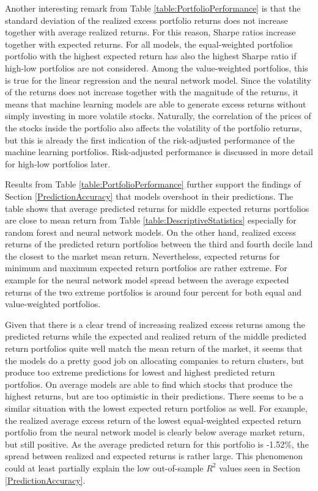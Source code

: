 \documentclass[12pt]{article}
\begin{document}
Another interesting remark from Table \ref{table:PortfolioPerformance} is that the standard deviation of the realized excess portfolio returns does not increase together with average realized returns. For this reason, Sharpe ratios increase together with expected returns. For all models, the equal-weighted portfolios portfolio with the highest expected return has also the highest Sharpe ratio if high-low portfolios are not considered. Among the value-weighted portfolios, this is true for the linear regression and the neural network model. Since the volatility of the returns does not increase together with the magnitude of the returns, it means that machine learning models are able to generate excess returns without simply investing in more volatile stocks. Naturally, the correlation of the prices of the stocks inside the portfolio also affects the volatility of the portfolio returns, but this is already the first indication of the risk-adjusted performance of the machine learning portfolios. Risk-adjusted performance is discussed in more detail for high-low portfolios later. \par

Results from Table \ref{table:PortfolioPerformance} further support the findings of Section \ref{PredictionAccuracy} that models overshoot in their predictions. The table shows that average predicted returns for middle expected returns portfolios are close to mean return from Table \ref{table:DescriptiveStatistics} especially for random forest and neural network models. On the other hand, realized excess returns of the predicted return portfolios between the third and fourth decile land the closest to the market mean return. Nevertheless, expected returns for minimum and maximum expected return portfolios are rather extreme. For example for the neural network model spread between the average expected returns of the two extreme portfolios is around four percent for both equal and value-weighted portfolios. \par

Given that there is a clear trend of increasing realized excess returns among the predicted returns while the expected and realized return of the middle predicted return portfolios quite well match the mean return of the market, it seems that the models do a pretty good job on allocating companies to return clusters, but produce too extreme predictions for lowest and highest predicted return portfolios. On average models are able to find which stocks that produce the highest returns, but are too optimistic in their predictions. There seems to be a similar situation with the lowest expected return portfolios as well. For example, the realized average excess return of the lowest equal-weighted expected return portfolio from the neural network model is clearly below average market return, but still positive. As the average predicted return for this portfolio is -1.52\%, the spread between realized and expected returns is rather large. This phenomenon could at least partially explain the low out-of-sample $R^2$ values seen in Section \ref{PredictionAccuracy}. \par  
\end{document}
